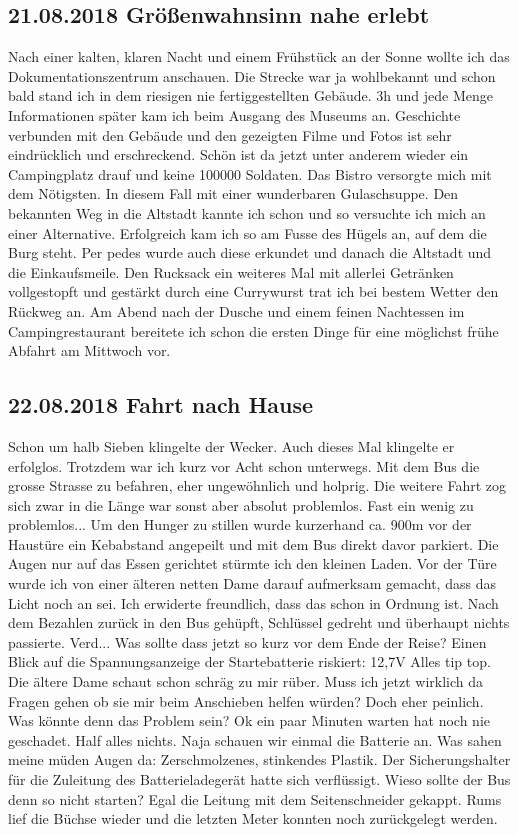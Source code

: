\subsection{21.08.2018 Größenwahnsinn nahe erlebt}
Nach einer kalten, klaren Nacht und einem Frühstück an der Sonne wollte ich das Dokumentationszentrum anschauen.
Die Strecke war ja wohlbekannt und schon bald stand ich in dem riesigen nie fertiggestellten Gebäude.
3h und jede Menge Informationen später kam ich beim Ausgang des Museums an.
Geschichte verbunden mit den Gebäude und den gezeigten Filme und Fotos ist sehr eindrücklich und erschreckend.
Schön ist da jetzt unter anderem wieder ein Campingplatz drauf und keine 100000 Soldaten.
Das Bistro versorgte mich mit dem Nötigsten.
In diesem Fall mit einer wunderbaren Gulaschsuppe.
Den bekannten Weg in die Altstadt kannte ich schon und so versuchte ich mich an einer Alternative.
Erfolgreich kam ich so am Fusse des Hügels an, auf dem die Burg steht.
Per pedes wurde auch diese erkundet und danach die Altstadt und die Einkaufsmeile.
Den Rucksack ein weiteres Mal mit allerlei Getränken vollgestopft und gestärkt durch eine Currywurst trat ich bei bestem Wetter den Rückweg an.
Am Abend nach der Dusche und einem feinen Nachtessen im Campingrestaurant bereitete ich schon die ersten Dinge für eine möglichst frühe Abfahrt am Mittwoch vor.

\subsection{22.08.2018 Fahrt nach Hause}
Schon um halb Sieben klingelte der Wecker.
Auch dieses Mal klingelte er erfolglos.
Trotzdem war ich kurz vor Acht schon unterwegs.
Mit dem Bus die grosse Strasse zu befahren, eher ungewöhnlich und holprig.
Die weitere Fahrt zog sich zwar in die Länge war sonst aber absolut problemlos.
Fast ein wenig zu problemlos...
Um den Hunger zu stillen wurde kurzerhand ca. 900m vor der Haustüre ein Kebabstand angepeilt und mit dem Bus direkt davor parkiert.
Die Augen nur auf das Essen gerichtet stürmte ich den kleinen Laden.
Vor der Türe wurde ich von einer älteren netten Dame darauf aufmerksam gemacht, dass das Licht noch an sei.
Ich erwiderte freundlich, dass das schon in Ordnung ist.
Nach dem Bezahlen zurück in den Bus gehüpft, Schlüssel gedreht und überhaupt nichts passierte.
Verd...
Was sollte dass jetzt so kurz vor dem Ende der Reise?
Einen Blick auf die Spannungsanzeige der Startebatterie riskiert: 12,7V
Alles tip top.
Die ältere Dame schaut schon schräg zu mir rüber.
Muss ich jetzt wirklich da Fragen gehen ob sie mir beim Anschieben helfen würden?
Doch eher peinlich.
Was könnte denn das Problem sein?
Ok ein paar Minuten warten hat noch nie geschadet.
Half alles nichts.
Naja schauen wir einmal die Batterie an.
Was sahen meine müden Augen da:
Zerschmolzenes, stinkendes Plastik.
Der Sicherungshalter für die Zuleitung des Batterieladegerät hatte sich verflüssigt.
Wieso sollte der Bus denn so nicht starten?
Egal die Leitung mit dem Seitenschneider gekappt.
Rums lief die Büchse wieder und die letzten Meter konnten noch zurückgelegt werden.

